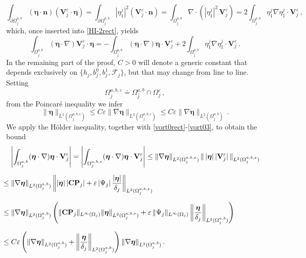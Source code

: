 \documentclass[11pt]{article}
\numberwithin{equation}{section}
\numberwithin{figure}{section}
\def\bbe{{\boldsymbol{\eta}}}
\def\n{{\mathbf n}}
\begin{document}
\begin{equation}
	\int_{\partial \Omega_j^{a,b}} (\bbe\cdot \n) (\mathbf{V}^{\varepsilon}_{j} \cdot \bbe) = \int_{\partial \Omega_j^{a,b}} |\eta^{j}_{1}|^{2} (\mathbf{V}^{\varepsilon}_{j} \cdot \n) = \int_{\Omega_j^{a,b}} \nabla \cdot ( |\eta^{j}_{1}|^{2} \, \mathbf{V}^{\varepsilon}_{j} ) = 2 \int_{\Omega_j^{a,b}} \eta^{j}_{1} \nabla \eta^{j}_{1} \cdot \mathbf{V}^{\varepsilon}_{j} \, ,
\end{equation}
which, once inserted into \eqref{HI-2rect}, yields
\begin{equation}\label{HI-3rect}
	\int_{ \Omega_j^{a,b}} (\bbe\cdot \nabla)\mathbf{V}^{\varepsilon}_{j} \cdot \bbe = - \int_{ \Omega_j^{a,b}} (\bbe\cdot \nabla) \bbe \cdot \mathbf{V}^{\varepsilon}_{j} + 2 \int_{\Omega_j^{a,b}} \eta^{j}_{1} \nabla \eta^{j}_{1} \cdot \mathbf{V}^{\varepsilon}_{j} \, .
\end{equation}
In the remaining part of the proof, $C > 0$ will denote a generic constant that depends exclusively on $\{h_{j},b^{0}_{j},b^{1}_{j},\mathcal{F}_{j} \}$, but that may change from line to line. Setting
$$
\Omega^{a,b,\varepsilon}_{j} \doteq \Omega_j^{a,b} \cap \Omega^{\varepsilon}_{j} \, ,
$$
from the Poincaré inequality we infer
\begin{equation} \label{vort03}
	\|\bbe \|_{L^{2}(\Omega^{a,b,\varepsilon}_{j})}  \leq C \varepsilon \|\nabla  \bbe \|_{L^{2}(\Omega^{a,b,\varepsilon}_{j})} \leq C \varepsilon \|\nabla  \bbe \|_{L^{2}(\Omega^{a,b}_{j})}  \, .
\end{equation}
We apply the H\"older inequality, together with \eqref{vort0rect}-\eqref{vort03}, to obtain the bound
\begin{equation} \label{vort3}
	\begin{aligned}
		& \left| \int_{\Omega_j^{a,b}} (\bbe \cdot \nabla)\bbe \cdot \mathbf{V}^{\varepsilon}_{j} \right| = \left| \int_{\Omega^{a,b,\varepsilon}_{j}} (\bbe \cdot \nabla)\bbe \cdot \mathbf{V}^{\varepsilon}_{j}  \right| \leq \|\nabla  \bbe \|_{L^{2}(\Omega^{a,b,\varepsilon}_{j})} \, \| \, |\bbe| \, |\mathbf{V}^{\varepsilon}_{j}| \, \|_{L^{2}(\Omega^{a,b,\varepsilon}_{j})} \\[6pt]
		& \hspace{-4mm} \leq \|\nabla  \bbe \|_{L^{2}(\Omega^{a,b}_{j})} \left\| |\bbe| \, |\mathbf{CP}_{j}| + \varepsilon \, |\Psi_{j}| \, \dfrac{|\bbe|}{\delta_{j}} \right\|_{L^{2}(\Omega^{a,b,\varepsilon}_{j})} \\[6pt]
		& \hspace{-4mm} \leq \|\nabla  \bbe \|_{L^{2}(\Omega^{a,b}_{j})}  \left( \| \mathbf{CP}_{j} \|_{L^{\infty}(\Omega_{j})} \|\bbe \|_{L^{2}(\Omega^{a,b,\varepsilon}_{j})}  + \varepsilon \, \| \Psi_{j} \|_{L^{\infty}(\Omega_{j})} \left\| \dfrac{\bbe}{\delta_{j}} \right\|_{L^{2}(\Omega^{a,b}_{j})}  \right) \\[6pt]
		& \hspace{-4mm} \leq C \varepsilon \left( \|\nabla  \bbe \|_{L^{2}(\Omega^{a,b}_{j})}  + \left\| \dfrac{\bbe}{\delta_{j}} \right\|_{L^{2}(\Omega^{a,b}_{j})}  \right) \|\nabla  \bbe \|_{L^{2}(\Omega^{a,b}_{j})} \, .
	\end{aligned}
\end{equation}
\end{document}
